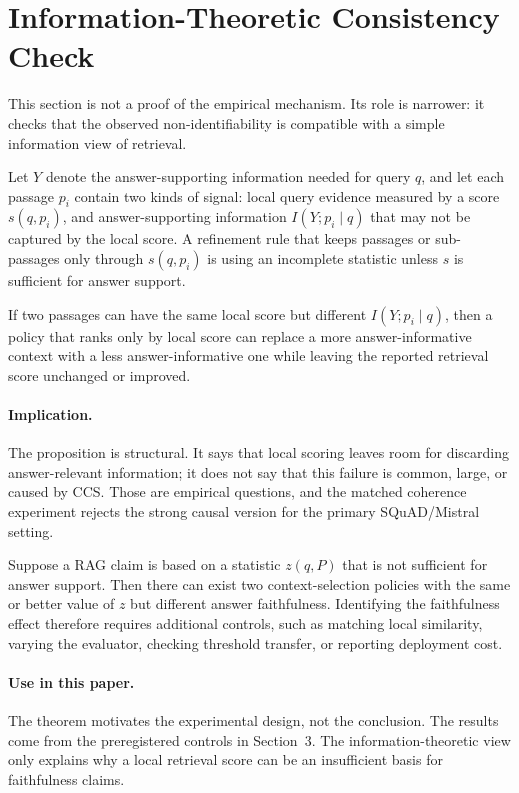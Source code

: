 \section{Information-Theoretic Consistency Check}

This section is not a proof of the empirical mechanism. Its role is narrower:
it checks that the observed non-identifiability is compatible with a simple
information view of retrieval.

Let $Y$ denote the answer-supporting information needed for query $q$, and let
each passage $p_i$ contain two kinds of signal: local query evidence measured
by a score $s(q,p_i)$, and answer-supporting information $I(Y;p_i\mid q)$ that
may not be captured by the local score. A refinement rule that keeps passages
or sub-passages only through $s(q,p_i)$ is using an incomplete statistic unless
$s$ is sufficient for answer support.

\begin{proposition}
If two passages can have the same local score but different
$I(Y;p_i\mid q)$, then a policy that ranks only by local score can replace a
more answer-informative context with a less answer-informative one while
leaving the reported retrieval score unchanged or improved.
\end{proposition}

\paragraph{Implication.}
The proposition is structural. It says that local scoring leaves room for
discarding answer-relevant information; it does not say that this failure is
common, large, or caused by CCS. Those are empirical questions, and the matched
coherence experiment rejects the strong causal version for the primary
SQuAD/Mistral setting.

\begin{theorem}
Suppose a RAG claim is based on a statistic $z(q,P)$ that is not sufficient for
answer support. Then there can exist two context-selection policies with the
same or better value of $z$ but different answer faithfulness. Identifying the
faithfulness effect therefore requires additional controls, such as matching
local similarity, varying the evaluator, checking threshold transfer, or
reporting deployment cost.
\end{theorem}

\paragraph{Use in this paper.}
The theorem motivates the experimental design, not the conclusion. The results
come from the preregistered controls in Section~3. The information-theoretic
view only explains why a local retrieval score can be an insufficient basis for
faithfulness claims.

